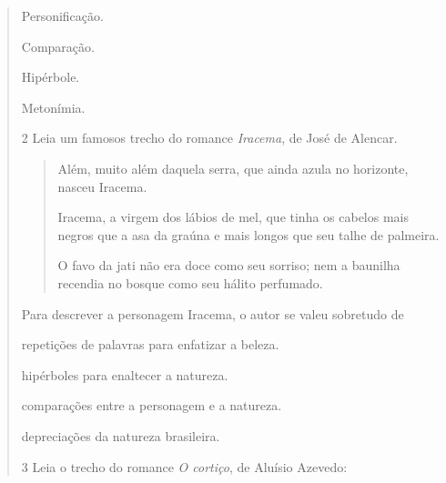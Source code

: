 \begin{quote}
{\begin{escolha}

  \item Personificação.
  
  \item Comparação.
  
  \item Hipérbole.
  
  \item Metonímia. 

\end{escolha}


\num{2} Leia um famosos trecho do romance \textit{Iracema}, de José de Alencar.

\begin{quote}

Além, muito além daquela serra, que ainda azula no
horizonte, nasceu Iracema.

Iracema, a virgem dos lábios de mel, que tinha os
cabelos mais negros que a asa da graúna e mais longos
que seu talhe de palmeira.

O favo da jati não era doce como seu sorriso; nem
a baunilha recendia no bosque como seu hálito perfumado.

\end{quote}


Para descrever a personagem Iracema, o autor se valeu sobretudo de

\begin{escolha}

  \item repetições de palavras para enfatizar a beleza. 

  \item hipérboles para enaltecer a natureza.

  \item comparações entre a personagem e a natureza.

  \item depreciações da natureza brasileira.

\end{escolha}


\num{3} Leia o trecho do romance \textit{O cortiço}, de Aluísio Azevedo:



}
\end{quote}
